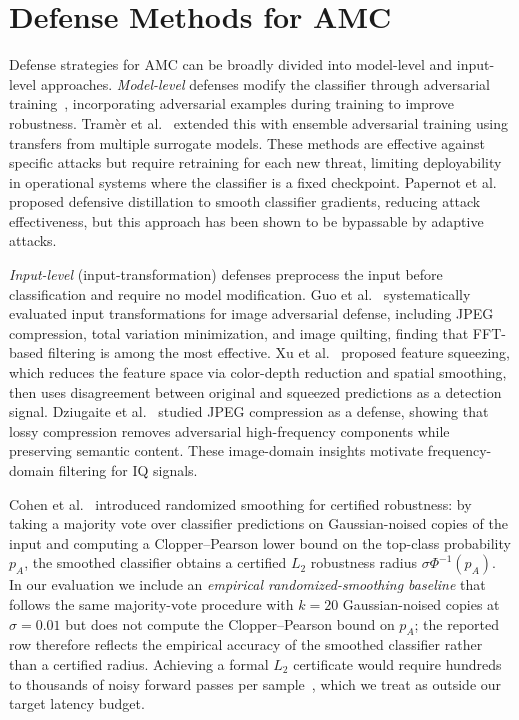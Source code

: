 \section{Defense Methods for AMC}

Defense strategies for AMC can be broadly divided into model-level and
input-level approaches. \emph{Model-level} defenses modify the classifier
through adversarial training~\cite{madry2018towards}, incorporating
adversarial examples during training to improve robustness. Tram\`{e}r et
al.~\cite{tramer2017ensemble} extended this with ensemble adversarial training
using transfers from multiple surrogate models. These methods are effective
against specific attacks but require retraining for each new threat, limiting
deployability in operational systems where the classifier is a fixed
checkpoint. Papernot et al.~\cite{papernot2016distillation} proposed defensive
distillation to smooth classifier gradients, reducing attack effectiveness,
but this approach has been shown to be bypassable by adaptive attacks.

\emph{Input-level} (input-transformation) defenses preprocess the input
before classification and require no model modification. Guo et
al.~\cite{guo2018input} systematically evaluated input transformations for
image adversarial defense, including JPEG compression, total variation
minimization, and image quilting, finding that FFT-based filtering is among
the most effective. Xu et al.~\cite{xu2018feature} proposed feature squeezing,
which reduces the feature space via color-depth reduction and spatial
smoothing, then uses disagreement between original and squeezed predictions
as a detection signal. Dziugaite et al.~\cite{dziugaite2016compression}
studied JPEG compression as a defense, showing that lossy compression removes
adversarial high-frequency components while preserving semantic content.
These image-domain insights motivate frequency-domain filtering for IQ
signals.

Cohen et al.~\cite{cohen2019certified} introduced randomized smoothing for
certified robustness: by taking a majority vote over classifier predictions
on Gaussian-noised copies of the input and computing a Clopper--Pearson
lower bound on the top-class probability $p_A$, the smoothed classifier
obtains a certified $L_2$ robustness radius $\sigma \Phi^{-1}(p_A)$. In our
evaluation we include an \emph{empirical randomized-smoothing baseline}
that follows the same majority-vote procedure with $k = 20$
Gaussian-noised copies at $\sigma = 0.01$ but does not compute the
Clopper--Pearson bound on $p_A$; the reported row therefore reflects the
empirical accuracy of the smoothed classifier rather than a certified
radius. Achieving a formal $L_2$ certificate would require hundreds to
thousands of noisy forward passes per sample~\cite{cohen2019certified},
which we treat as outside our target latency budget.

